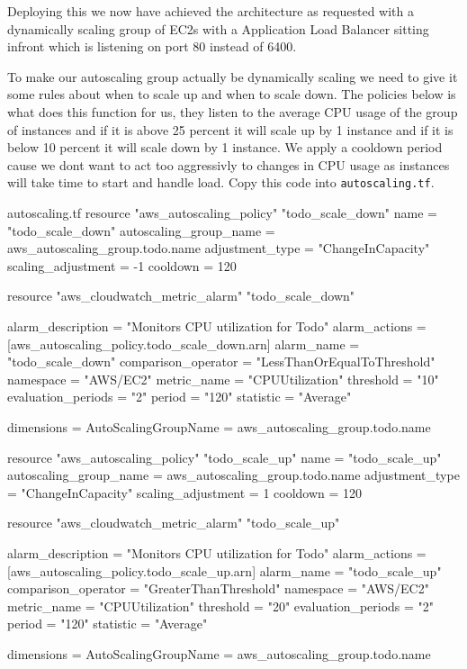 \documentclass{csse4400}
\begin{document}
Deploying this we now have achieved the architecture as requested with a dynamically scaling group of EC2s with a Application Load Balancer sitting infront which is listening on port 80 instead of 6400.

To make our autoscaling group actually be dynamically scaling we need to give it some rules about when to scale up and when to scale down. The policies below is what does this function for us, they listen to the average CPU usage of the group of instances and if it is above 25 percent it will scale up by 1 instance and if it is below 10 percent it will scale down by 1 instance. We apply a cooldown period cause we dont want to act too aggressivly to changes in CPU usage as instances will take time to start and handle load. Copy this code into \texttt{autoscaling.tf}.

\begin{code}[language=terraform,numbers=none]{autoscaling.tf}
resource "aws_autoscaling_policy" "todo_scale_down" {
  name                   = "todo_scale_down"
  autoscaling_group_name = aws_autoscaling_group.todo.name
  adjustment_type        = "ChangeInCapacity"
  scaling_adjustment     = -1
  cooldown               = 120
}

resource "aws_cloudwatch_metric_alarm" "todo_scale_down" {
  alarm_description   = "Monitors CPU utilization for Todo"
  alarm_actions       = [aws_autoscaling_policy.todo_scale_down.arn]
  alarm_name          = "todo_scale_down"
  comparison_operator = "LessThanOrEqualToThreshold"
  namespace           = "AWS/EC2"
  metric_name         = "CPUUtilization"
  threshold           = "10"
  evaluation_periods  = "2"
  period              = "120"
  statistic           = "Average"

  dimensions = {
    AutoScalingGroupName = aws_autoscaling_group.todo.name
  }
}

resource "aws_autoscaling_policy" "todo_scale_up" {
  name                   = "todo_scale_up"
  autoscaling_group_name = aws_autoscaling_group.todo.name
  adjustment_type        = "ChangeInCapacity"
  scaling_adjustment     = 1
  cooldown               = 120
}

resource "aws_cloudwatch_metric_alarm" "todo_scale_up" {
  alarm_description   = "Monitors CPU utilization for Todo"
  alarm_actions       = [aws_autoscaling_policy.todo_scale_up.arn]
  alarm_name          = "todo_scale_up"
  comparison_operator = "GreaterThanThreshold"
  namespace           = "AWS/EC2"
  metric_name         = "CPUUtilization"
  threshold           = "20"
  evaluation_periods  = "2"
  period              = "120"
  statistic           = "Average"

  dimensions = {
    AutoScalingGroupName = aws_autoscaling_group.todo.name
  }
}
\end{code}
\end{document}
